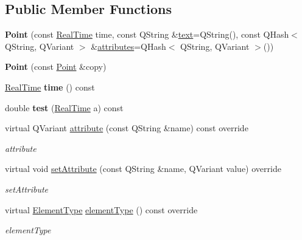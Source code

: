 \subsection*{Public Member Functions}
\begin{DoxyCompactItemize}
\item 
\mbox{\label{class_point_a24182d30ef5a2ef1d58e4550a9dfa76f}} 
{\bfseries Point} (const \hyperlink{struct_real_time}{Real\+Time} time, const Q\+String \&\hyperlink{class_annotation_element_aa59bd98501e3882990681f6aff2ee863}{text}=Q\+String(), const Q\+Hash$<$ Q\+String, Q\+Variant $>$ \&\hyperlink{class_annotation_element_a58082d92f50c4fde2d18ce24ef3fd283}{attributes}=Q\+Hash$<$ Q\+String, Q\+Variant $>$())
\item 
\mbox{\label{class_point_a418ee46266f3561c7d31019faffb0910}} 
{\bfseries Point} (const \hyperlink{class_point}{Point} \&copy)
\item 
\mbox{\label{class_point_aa88bc0753bbb9a1478c2e01564c0c6c5}} 
\hyperlink{struct_real_time}{Real\+Time} {\bfseries time} () const
\item 
\mbox{\label{class_point_af2368edb1ff2cbdef2bb857c2436c578}} 
double {\bfseries test} (\hyperlink{struct_real_time}{Real\+Time} a) const
\item 
virtual Q\+Variant \hyperlink{class_point_a0ff561e393cdf7475126b96de6106d12}{attribute} (const Q\+String \&name) const override
\begin{DoxyCompactList}\small\item\em attribute \end{DoxyCompactList}\item 
virtual void \hyperlink{class_point_a997cc0d524866e257f58ef9a3e82a432}{set\+Attribute} (const Q\+String \&name, Q\+Variant value) override
\begin{DoxyCompactList}\small\item\em set\+Attribute \end{DoxyCompactList}\item 
virtual \hyperlink{class_annotation_element_af5282990ffbe25eeea8ab02037e344b0}{Element\+Type} \hyperlink{class_point_ac576e4660a79cf5bbffa4591a22d2a28}{element\+Type} () const override
\begin{DoxyCompactList}\small\item\em element\+Type \end{DoxyCompactList}\item 

\end{DoxyCompactItemize}
